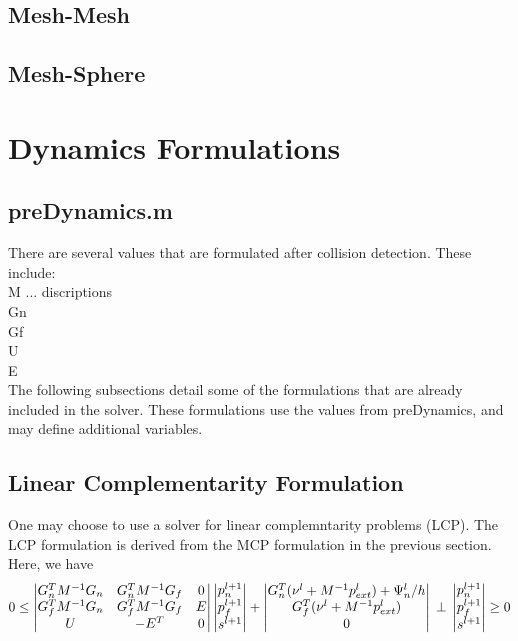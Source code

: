 \documentclass{article}
\begin{document}
\subsection{Mesh-Mesh}
\subsection{Mesh-Sphere} 

\newpage
\section{Dynamics Formulations} 
\label{sec:dynamics}

\subsection{preDynamics.m} \label{sec:preDynamics}
There are several values that are formulated after collision detection.  These include: \\
M ... discriptions \\
Gn \\
Gf \\
U \\
E \\
The following subsections detail some of the formulations that are already included in the solver.  These formulations use the values from preDynamics, and may define additional variables.  

\subsection{Linear Complementarity Formulation}
One may choose to use a solver for linear complemntarity problems (LCP).  The LCP formulation is derived from the MCP formulation in the previous section.  Here, we have 
\begin{equation}
0 \leq
\begin{vmatrix} 
G_n^{T} M^{-1} G_n & G_n^{T} M^{-1} G_f & 0 \\
G_f^{T} M^{-1} G_n & G_f^{T} M^{-1} G_f & E \\
U & -E^{T} & 0
\end{vmatrix} 
\begin{vmatrix}
p_{n}^{l+1} \\
p_{f}^{l+1} \\
s^{l+1}
\end{vmatrix} 
+ 
\begin{vmatrix}
G_n^{T} (\nu^{l} + M^{-1} p^{l}_{ext}) + \Psi_{n}^{l}/h \\
G_f^{T} (\nu^{l} + M^{-1} p^{l}_{ext}) \\
0
\end{vmatrix} \\
\perp  \\
\begin{vmatrix}
p_{n}^{l+1} \\
p_{f}^{l+1} \\
s^{l+1}
\end{vmatrix}  \geq 0  \nonumber
\end{equation}
\end{document}
